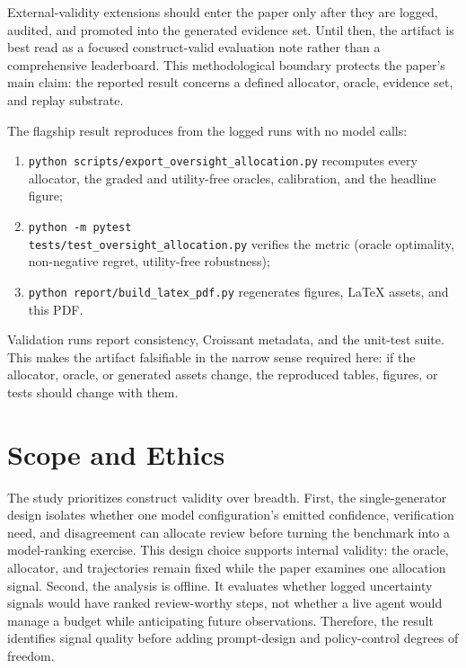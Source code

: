 \documentclass[10pt,twocolumn]{article}
\begin{document}
External-validity extensions should enter the paper only after they are logged, audited, and promoted into the generated evidence set. Until then, the artifact is best read as a focused construct-valid evaluation note rather than a comprehensive leaderboard. This methodological boundary protects the paper's main claim: the reported result concerns a defined allocator, oracle, evidence set, and replay substrate.

The flagship result reproduces from the logged runs with no model calls:
\begin{enumerate}[leftmargin=*,itemsep=0.08em,topsep=0.2em,parsep=0pt,partopsep=0pt]
  \item \texttt{python scripts/export\_oversight\_allocation.py} recomputes every allocator, the graded and utility-free oracles, calibration, and the headline figure;
  \item \texttt{python -m pytest}\\
  \texttt{tests/test\_oversight\_allocation.py} verifies the metric (oracle optimality, non-negative regret, utility-free robustness);
  \item \texttt{python report/build\_latex\_pdf.py} regenerates figures, LaTeX assets, and this PDF.
\end{enumerate}
Validation runs report consistency, Croissant metadata, and the unit-test suite. This makes the artifact falsifiable in the narrow sense required here: if the allocator, oracle, or generated assets change, the reproduced tables, figures, or tests should change with them.

\section{Scope and Ethics}

The study prioritizes construct validity over breadth. First, the single-generator design isolates whether one model configuration's emitted confidence, verification need, and disagreement can allocate review before turning the benchmark into a model-ranking exercise. This design choice supports internal validity: the oracle, allocator, and trajectories remain fixed while the paper examines one allocation signal. Second, the analysis is offline. It evaluates whether logged uncertainty signals would have ranked review-worthy steps, not whether a live agent would manage a budget while anticipating future observations. Therefore, the result identifies signal quality before adding prompt-design and policy-control degrees of freedom.
\end{document}
